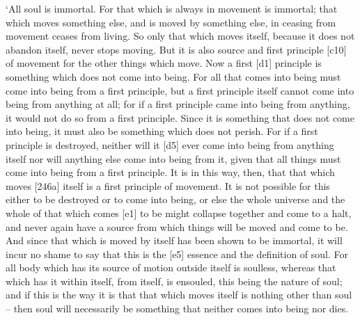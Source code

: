 ‘All soul is immortal. For that which is always in movement is immortal;
that which moves something else, and is moved by something else, in
ceasing from movement ceases from living. So only that which moves
itself, because it does not abandon itself, never stops moving. But it
is also source and first principle {[}c10{]} of movement for the other
things which move. Now a first {[}d1{]} principle is something which
does not come into being. For all that comes into being must come into
being from a first principle, but a first principle itself cannot come
into being from anything at all; for if a first principle came into
being from anything, it would not do so from a first
principle. Since it is
something that does not come into being, it must also be something which
does not perish. For if a first principle is destroyed, neither will it
{[}d5{]} ever come into being from anything itself nor will anything
else come into being from it, given that all things must come into being
from a first principle. It is in this way, then, that that which moves
{[}246a{]} itself is a first principle of movement. It is not possible
for this either to be destroyed or to come into being, or else the whole
universe and the whole of that which comes {[}e1{]} to be might collapse
together and come to a halt, and never again have a source from which
things will be moved and come to be. And since that which is moved by
itself has been shown to be immortal, it will incur no shame to say that
this is the {[}e5{]} essence and the definition of soul. For all body
which has its source of motion outside itself is soulless, whereas that
which has it within itself, from itself, is ensouled, this being the
nature of soul; and if this is the way it is that that which moves
itself is nothing other than soul -- then soul will necessarily be
something that neither comes into being nor dies.

